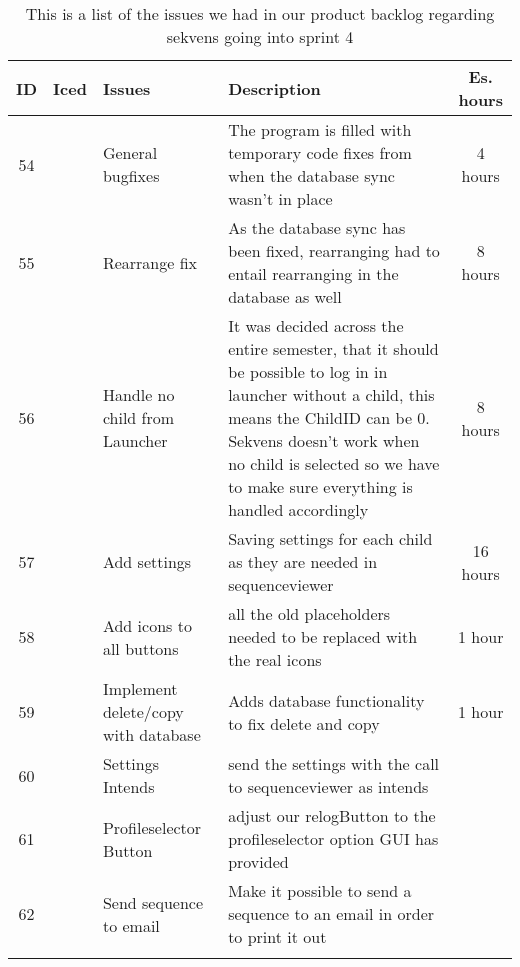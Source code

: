 \begin{longtable} { | c | c | p{5cm} | p{5cm} | c | } 
\hline
	ID 	&	Iced	&	Issues	&	Description		&	 Es. hours \\\hline
	54	& 	 	&	General bugfixes		& 	The program is filled with temporary code fixes from when the database sync wasn't in place	 & 4 hours  \\\hline
	55	& 	 	&	Rearrange fix	& 	As the database sync has been fixed, rearranging had to entail rearranging in the database as well	 &   8 hours \\\hline
	56	& 	 	&	Handle no child from Launcher	& 	It was decided across the entire semester, that it should be possible to log in in launcher without a child, this means the ChildID can be 0. Sekvens doesn't work when no child is selected so we have to make sure everything is handled accordingly	 &  8 hours \\\hline
	57	& 	 	&	Add settings	& 	Saving settings for each child as they are needed in sequenceviewer	& 	16 hours  \\\hline
	58	& 	 	&	Add icons to all buttons	& 	all the old placeholders needed to be replaced with the real icons	 & 	1 hour  \\\hline
	59	& 	 	&	Implement delete/copy with database	& 	Adds database functionality to fix delete and copy	 & 1 hour  \\\hline
	60	& 	 	&	Settings Intends		& 	send the settings with the call to sequenceviewer as intends	 &   \\\hline
	61	& 	 	&	Profileselector Button	& 	adjust our relogButton to the profileselector option GUI has provided	 &   \\\hline
	62	& 	 	&	Send sequence to email	& 	Make it possible to send a sequence to an email in order to print it out &   \\\hline
\caption{This is a list of the issues we had in our product backlog regarding sekvens going into sprint 4}
\label{tab:spr4_prodblog}
\end{longtable}

